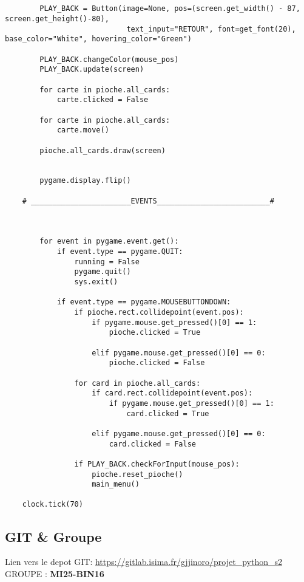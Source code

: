 \begin{lstlisting}
            

        PLAY_BACK = Button(image=None, pos=(screen.get_width() - 87, screen.get_height()-80), 
                            text_input="RETOUR", font=get_font(20), base_color="White", hovering_color="Green")

        PLAY_BACK.changeColor(mouse_pos)
        PLAY_BACK.update(screen)
        
        for carte in pioche.all_cards:
            carte.clicked = False

        for carte in pioche.all_cards:
            carte.move()

        pioche.all_cards.draw(screen)  


        pygame.display.flip()

    # _______________________EVENTS__________________________#

        

        for event in pygame.event.get():
            if event.type == pygame.QUIT:
                running = False
                pygame.quit()
                sys.exit()
        
            if event.type == pygame.MOUSEBUTTONDOWN:
                if pioche.rect.collidepoint(event.pos):
                    if pygame.mouse.get_pressed()[0] == 1:
                        pioche.clicked = True

                    elif pygame.mouse.get_pressed()[0] == 0:
                        pioche.clicked = False

                for card in pioche.all_cards:
                    if card.rect.collidepoint(event.pos):
                        if pygame.mouse.get_pressed()[0] == 1:
                            card.clicked = True

                    elif pygame.mouse.get_pressed()[0] == 0:
                        card.clicked = False

                if PLAY_BACK.checkForInput(mouse_pos):
                    pioche.reset_pioche()
                    main_menu()

    clock.tick(70)
	\end{lstlisting}
	
	\subsection{GIT \& Groupe}
	\noindent Lien vers le depot GIT:  \href{https://gitlab.isima.fr/gjjinoro/projet_python_s2}{https://gitlab.isima.fr/gjjinoro/projet\_python\_s2} \\
	GROUPE : \textbf{MI25-BIN16}